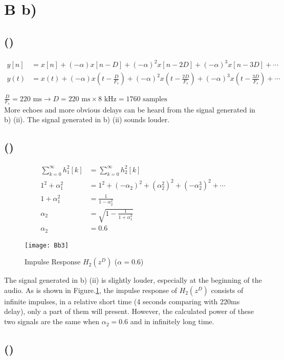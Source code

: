 \documentclass{article}
\newenvironment{homeworkProblem}[1]{
	\section*{#1}
	}{
}
\newenvironment{homeworkSection}[1]{
	\subsection*{#1}
	}{
}
\begin{document}
\begin{homeworkProblem}{B b)}
\begin{homeworkSection}{()}
\begin{align*}
y[n] &= x[n] + (-\alpha) x[n-D] + (-\alpha)^2 x[n-2D] + (-\alpha)^3 x[n-3D] + \cdots\\
y(t) &= x(t) + (-\alpha) x(t-\frac{D}{F_s}) + (-\alpha)^2 x(t-\frac{2D}{F_s}) + (-\alpha)^3 x(t-\frac{3D}{F_s}) + \cdots
\end{align*}

$\frac{D}{F_s}=\text{220 ms} \longrightarrow D = 220 \text{ ms} \times 8\text{ kHz} = 1760 \text{ samples}$\\

More echoes and more obvious delays can be heard from the signal generated in b) (ii). The signal generated in b) (ii) sounds louder.

\end{homeworkSection}


\begin{homeworkSection}{()}

\begin{align*}
\sum_{k=0}^{\infty} h_1^2[k] &= \sum_{k=0}^{\infty} h_2^2[k]\\
1^2 + \alpha_1^2 &= 1^2 + (-\alpha_2)^2 + (\alpha_2^2)^2 + (-\alpha_2^3)^2 + \cdots\\
1 + \alpha_1^2 &= \frac{1}{1 - \alpha_2^2}\\
\alpha_2 &= \sqrt{1 - \frac{1}{1 + \alpha_1^2}}\\
\alpha_2 &= 0.6
\end{align*}

\begin{figure}[H]
\centering
\texttt{[image: Bb3]}
\caption{Impulse Response $H_2(z^D)$ ($\alpha=0.6$)}
\label{Bb3}
\end{figure}

The signal generated in b) (ii) is slightly louder, especially at the beginning of the audio. As is shown in Figure.\ref{Bb3}, the impulse response of $H_2(z^D)$ consists of infinite impulses, in a relative short time (4 seconds comparing with 220ms delay), only a part of them will present. However, the calculated power of these two signals are the same when $\alpha_2=0.6$ and in infinitely long time.

\end{homeworkSection}


\begin{homeworkSection}{()}


\end{homeworkSection}
\end{homeworkProblem}
\end{document}
